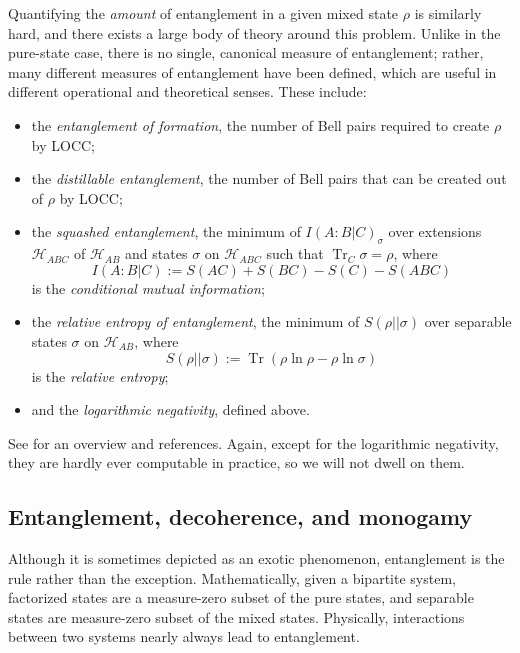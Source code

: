 \documentclass[11pt]{article}
\newcommand{\HH}{\mathcal{H}}
\DeclareMathOperator{\Tr}{Tr}
\begin{document}
Quantifying the \emph{amount} of entanglement in a given mixed state $\rho$ is similarly hard, and there exists a large body of theory around this problem. Unlike in the pure-state case, there is no single, canonical measure of entanglement; rather, many different measures of entanglement have been defined, which are useful in different operational and theoretical senses. These include:
\begin{itemize}
\item the \emph{entanglement of formation}, the number of Bell pairs required to create $\rho$ by LOCC; 
\item the \emph{distillable entanglement}, the number of Bell pairs that can be created out of $\rho$ by LOCC; 
\item the \emph{squashed entanglement}, the minimum of $I(A:B|C)_\sigma$ over extensions $\HH_{ABC}$ of $\HH_{AB}$ and states $\sigma$ on $\HH_{ABC}$ such that $\Tr_C\sigma=\rho$, where 
\begin{equation}
I(A:B|C):=S(AC)+S(BC)-S(C)-S(ABC)
\end{equation}
is the \emph{conditional mutual information}; 
\item the \emph{relative entropy of entanglement}, the minimum of $S(\rho||\sigma)$ over separable states $\sigma$ on $\HH_{AB}$, where
\begin{equation}
S(\rho||\sigma):=\Tr(\rho\ln\rho-\rho\ln\sigma)
\end{equation}
is the \emph{relative entropy}; 
\item and the \emph{logarithmic negativity}, defined above.
\end{itemize}
See \cite{Plenio:2007zz} for an overview and references. Again, except for the logarithmic negativity, they are hardly ever computable in practice, so we will not dwell on them.


\subsection{Entanglement, decoherence, and monogamy}

Although it is sometimes depicted as an exotic phenomenon, entanglement is the rule rather than the exception. Mathematically, given a bipartite system, factorized states are a measure-zero subset of the pure states, and separable states are measure-zero subset of the mixed states. Physically, interactions between two systems nearly always lead to entanglement.
\end{document}
